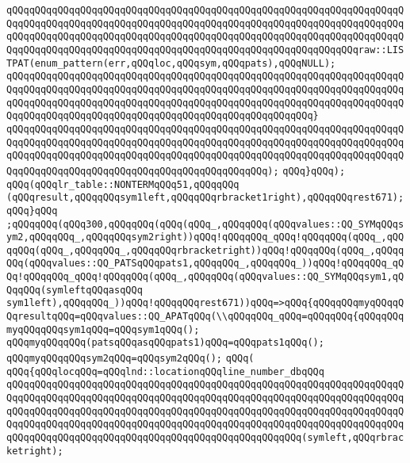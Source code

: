 \verb|qQQqqQQqqQQqqQQqqQQqqQQqqQQqqQQqqQQqqQQqqQQqqQQqqQQqqQQqqQQqqQQqqQQqqQQqqQQqqQQqqQQqqQQqqQQqqQQqqQQqqQQqqQQqqQQqqQQqqQQqqQQqqQQqqQQqqQQqqQQqqQQqqQQqqQQqqQQqqQQqqQQqqQQqqQQqqQQqqQQqqQQqqQQqqQQqqQQqqQQqqQQqqQQqqQQqqQQqqQQqqQQqqQQqqQQqqQQqqQQqqQQqqQQqqQQqqQQqqQQqqQQqqQQqqQQqraw::LISTPAT(enum_pattern(err,qQQqloc,qQQqsym,qQQqpats),qQQqNULL);|\newline
\verb|qQQqqQQqqQQqqQQqqQQqqQQqqQQqqQQqqQQqqQQqqQQqqQQqqQQqqQQqqQQqqQQqqQQqqQQqqQQqqQQqqQQqqQQqqQQqqQQqqQQqqQQqqQQqqQQqqQQqqQQqqQQqqQQqqQQqqQQqqQQqqQQqqQQqqQQqqQQqqQQqqQQqqQQqqQQqqQQqqQQqqQQqqQQqqQQqqQQqqQQqqQQqqQQqqQQqqQQqqQQqqQQqqQQqqQQqqQQqqQQqqQQqqQQqqQQqqQQqqQQqqQQq}|\newline
\verb|qQQqqQQqqQQqqQQqqQQqqQQqqQQqqQQqqQQqqQQqqQQqqQQqqQQqqQQqqQQqqQQqqQQqqQQqqQQqqQQqqQQqqQQqqQQqqQQqqQQqqQQqqQQqqQQqqQQqqQQqqQQqqQQqqQQqqQQqqQQqqQQqqQQqqQQqqQQqqQQqqQQqqQQqqQQqqQQqqQQqqQQqqQQqqQQqqQQqqQQqqQQqqQQqqQQqqQQqqQQqqQQqqQQqqQQqqQQqqQQqqQQqqQQqqQQqqQQq);|\newline
\verb|qQQq}qQQq);|\newline
\verb|qQQq(qQQqlr_table::NONTERMqQQq51,qQQqqQQq|\newline
\verb|(qQQqresult,qQQqqQQqsym1left,qQQqqQQqrbracket1right),qQQqqQQqrest671);|\newline
\verb|qQQq}qQQq|\newline
\verb|;qQQqqQQq(qQQq300,qQQqqQQq(qQQq(qQQq_,qQQqqQQq(qQQqvalues::QQ_SYMqQQqsym2,qQQqqQQq_,qQQqqQQqsym2right))qQQq!qQQqqQQq_qQQq!qQQqqQQq(qQQq_,qQQqqQQq(qQQq_,qQQqqQQq_,qQQqqQQqrbracketright))qQQq!qQQqqQQq(qQQq_,qQQqqQQq(qQQqvalues::QQ_PATSqQQqpats1,qQQqqQQq_,qQQqqQQq_))qQQq!qQQqqQQq_qQQq!qQQqqQQq_qQQq!qQQqqQQq(qQQq_,qQQqqQQq(qQQqvalues::QQ_SYMqQQqsym1,qQQqqQQq(symleftqQQqasqQQq|\newline
\verb|sym1left),qQQqqQQq_))qQQq!qQQqqQQqrest671))qQQq=>qQQq{qQQqqQQqmyqQQqqQQqresultqQQq=qQQqvalues::QQ_APATqQQq(\\qQQqqQQq_qQQq=qQQqqQQq{qQQqqQQqmyqQQqqQQqsym1qQQq=qQQqsym1qQQq();|\newline
\verb|qQQqmyqQQqqQQq(patsqQQqasqQQqpats1)qQQq=qQQqpats1qQQq();|\newline
\verb|qQQqmyqQQqqQQqsym2qQQq=qQQqsym2qQQq();|\newline
\verb|qQQq(|\newline
\verb|qQQq{qQQqlocqQQq=qQQqlnd::locationqQQqline_number_dbqQQq|\newline
\verb|qQQqqQQqqQQqqQQqqQQqqQQqqQQqqQQqqQQqqQQqqQQqqQQqqQQqqQQqqQQqqQQqqQQqqQQqqQQqqQQqqQQqqQQqqQQqqQQqqQQqqQQqqQQqqQQqqQQqqQQqqQQqqQQqqQQqqQQqqQQqqQQqqQQqqQQqqQQqqQQqqQQqqQQqqQQqqQQqqQQqqQQqqQQqqQQqqQQqqQQqqQQqqQQqqQQqqQQqqQQqqQQqqQQqqQQqqQQqqQQqqQQqqQQqqQQqqQQqqQQqqQQqqQQqqQQqqQQqqQQqqQQqqQQqqQQqqQQqqQQqqQQqqQQqqQQqqQQqqQQqqQQqqQQqqQQq(symleft,qQQqrbracketright);|\newline
